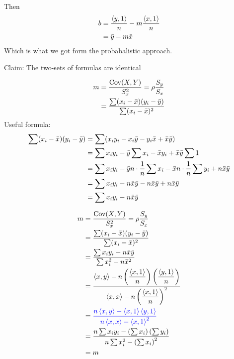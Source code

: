 
\noindent Then %
\begin{align*}
    b &= \frac{\inner{y,1}}{n} - m \frac{\inner{x,1}}{n}\\
    &= \bar{y} - m \bar{x}
\end{align*}
Which is what we got form the probabalistic approach.

\nnl Claim: The two-sets of formulas are identical

\begin{align*}
    m &= \frac{\operatorname{Cov}(X,Y)}{S_x^2} = \rho \frac{S_y}{S_x}\\
    &= \frac{\sum(x_i-\bar{x})(y_i-\bar{y})}{\sum (x_i - \bar{x})^2}
\end{align*}
Useful formula:
\begin{align*}
    \sum (x_i - \bar{x})(y_i - \bar{y}) &= \sum (x_i y_i - x_i \bar{y} - y_i \bar{x} + \bar{x}\bar{y})\\
    &= \sum x_i y_i - \bar{y} \sum x_i - \bar{x} y_i + \bar{x}\bar{y} \sum 1\\
    &= \sum x_i y_i - \bar{y} n \cdot \over{n} \sum x_i - \bar{x} n \cdot \over{n} \sum y_i + n \bar{x} \bar{y}\\
    &= \sum x_iy_i - n \bar{x} \bar{y} -  n\bar{x} \bar{y} +  n\bar{x} \bar{y}\\
    &= \sum x_i y_i - n\bar{x} \bar{y}
\end{align*}

\begin{align*}
    m &= \frac{\Cov(X,Y)}{S_x^2} = \rho \frac{S_y}{S_x}\\
    &= \frac{\sum(x_i-\bar{x})(y_i-\bar{y})}{\sum (x_i - \bar{x})^2}\\
    &= \frac{\sum x_iy_i - n  \bar{x} \bar{y}}{\sum x_i^2 - n \bar{x}^2}\\
    &= \frac{\inner{x,y} - n \pfrac*{\inner{x,1}}{n} \pfrac*{\inner{y,1}}{n} }{\inner{x,x} - n \pfrac*{\inner{x,1}}{n}^2}\\
    &= \setBlue \frac{n\inner{x,y} - \inner{x,1}\inner{y,1}}{n \inner{x,x} - \inner{x,1}^2}\\
    &= \frac{n\sum x_i y_i - \pars{\sum x_i}\pars{\sum y_i}}{n \sum x_i^2 - \pars{\sum x_i}^2}\\
    &= m
\end{align*}


